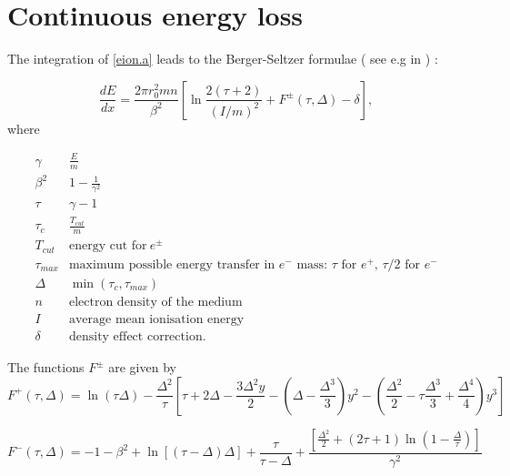 \section{Continuous energy loss}
The integration of \ref{eion.a} leads to the Berger-Seltzer
formulae ( see e.g in 
   \cite{eion.messel}) :

\begin{equation}
\label{eion.d}
\frac {dE}{dx} = \frac{2 \pi r_0^ 2 mn }{\beta^2}
       \left [\ln \frac{2(\tau + 2)} {(I/m)^2}+ F^{\pm} (\tau , \Delta )
- \delta \right ],
\end{equation}
 where

\[
\begin{array}{ll}
\gamma           & \frac{E}{m}                           \\
\beta^2          & 1-\frac{1}{\gamma^2}                  \\
\tau             & \gamma-1                              \\
\tau_c           & \frac{T_{cut}}{m}           \\
 T_{cut}         &  \mbox{energy cut for} \: e^{\pm}      \\
\tau_{max}       & \mbox{maximum possible energy transfer in $e^-$ mass:
  $\tau$ for $e^+$, $\tau/2$ for $e^-$}  \\
\Delta           & \min(\tau_c,\tau_{max})              \\
n                & \mbox{electron density of the medium}        \\
I                & \mbox{average mean ionisation energy}        \\
\delta           & \mbox{density effect correction}.
\end{array}
\]

The functions $ F^{\pm}$  are given by
\begin{equation}
\label{eion.e}
F^+ (\tau,\Delta) =\ln(\tau\Delta ) -
\frac{\Delta^2}{\tau}\left[\tau + 2 \Delta -
\frac{3\Delta^2 y } {2} -\left(\Delta - \frac{\Delta^3 }{3} \right) y^2 
- \left (\frac{\Delta^2}{2} - \tau
       \frac{\Delta^3}{3} + \frac{\Delta^4 } {4} \right)
          y^3  \right]  
\end{equation}

\begin{equation}
\label{eion.f}
F^- (\tau,\Delta ) = -1 -\beta^2 +\ln \left [(\tau - \Delta)
\Delta \right ] + \frac{\tau}{\tau -\Delta}+\frac{\left [
\frac{\Delta^2}{2} + ( 2\tau +1) \ln
\left (1- \frac{\Delta}{\tau} \right ) \right ]}{\gamma^2}
\end{equation}

